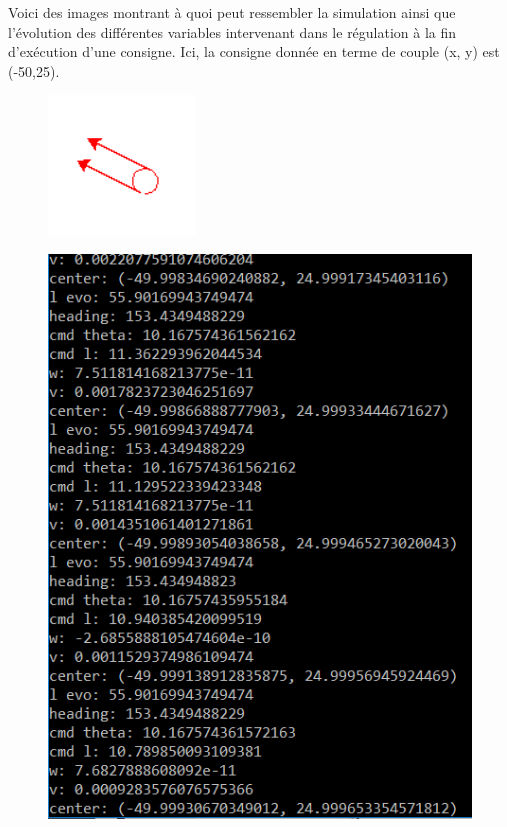 \documentclass[a4paper,11pt]{article}
\begin{document}
Voici des images montrant à quoi peut ressembler la simulation ainsi que l'évolution des différentes variables intervenant dans le régulation à la fin d'exécution d'une consigne. Ici, la consigne donnée en terme de couple (x, y) est (-50,25).
\begin{figure}[H]
    \centering
    \includegraphics[scale = 1.5]{Capturesimu.PNG}
\end{figure}
\begin{figure}[H]
    \centering
    \includegraphics[scale = 1.1]{Capturesimu2.PNG}
\end{figure}
\end{document}
